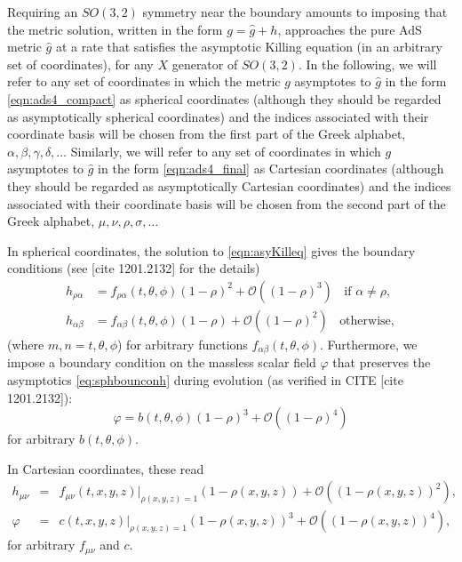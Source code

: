\documentclass[a4paper,11pt]{article}
\numberwithin{equation}{section}
\begin{document}
Requiring an $SO(3,2)$ symmetry near the boundary amounts to imposing that the metric solution, written in the form $g=\hat{g}+h$, approaches the pure AdS metric $\hat{g}$ at a rate that satisfies the asymptotic Killing equation (in an arbitrary set of coordinates), 
for any $X$ generator of $SO(3,2)$. 
In the following, we will refer to any set of coordinates in which the metric $g$ asymptotes to $\hat{g}$ in the form \eqref{eqn:ads4_compact} as spherical coordinates (although they should be regarded as asymptotically spherical coordinates) and the indices associated with their coordinate basis will be chosen from the first part of the Greek alphabet, $\alpha,\beta,\gamma,\delta,\dots$
Similarly, we will refer to any set of coordinates in which $g$ asymptotes to $\hat{g}$ in the form \eqref{eqn:ads4_final} as Cartesian coordinates (although they should be regarded as asymptotically Cartesian coordinates) and the indices associated with their coordinate basis will be chosen from the second part of the Greek alphabet, $\mu,\nu,\rho,\sigma,\dots$

In spherical coordinates, the solution to \eqref{eqn:asyKilleq} gives the boundary conditions (see [cite 1201.2132] for the details)
\begin{eqnarray}
\label{eq:sphbounconh}
h_{\rho\alpha}&=f_{\rho\alpha}(t,\theta,\phi)(1-\rho)^2+\mathcal{O}((1-\rho)^3) \;\; \textrm{ if $\alpha\neq\rho$}, \\ \nonumber
h_{\alpha\beta}&=f_{\alpha\beta}(t,\theta,\phi)(1-\rho)+\mathcal{O}((1-\rho)^{2}) \;\; \textrm{ otherwise},
\end{eqnarray}
(where $m,n=t,\theta,\phi$) for arbitrary functions $f_{\alpha\beta}(t,\theta,\phi)$. Furthermore, we impose a boundary condition on the massless scalar field $\varphi$ that preserves the asymptotics \eqref{eq:sphbounconh} during evolution (as verified in CITE [cite 1201.2132]):
\begin{equation}\label{eq:sphbounconphi}
\varphi=b(t,\theta,\phi)(1-\rho)^3+\mathcal{O}((1-\rho)^4)
\end{equation}
for arbitrary $b(t,\theta,\phi)$.

In Cartesian coordinates, these read
\begin{eqnarray}
\label{eq:carbouncondh}
h_{\mu\nu}&=&f_{\mu\nu}(t,x,y,z)|_{\rho(x,y,z)=1}(1-\rho(x,y,z))+\mathcal{O}((1-\rho(x,y,z))^{2}), \\
\label{eq:carbouncondphi}
\varphi&=&c(t,x,y,z)|_{\rho(x,y,z)=1}(1-\rho(x,y,z))^3+\mathcal{O}((1-\rho(x,y,z))^{4}), 
\end{eqnarray}
for arbitrary $f_{\mu\nu}$ and $c$.
\end{document}
